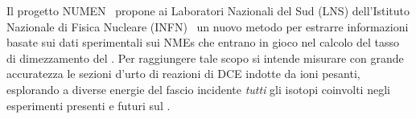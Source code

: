 Il progetto NUMEN~\cite{cappuzzello:epja18} propone ai Laboratori Nazionali del Sud (LNS) dell'Istituto Nazionale di Fisica Nucleare (INFN)~\cite{lns} un nuovo metodo per estrarre informazioni basate sui dati sperimentali sui NMEs che entrano in gioco nel calcolo del tasso di dimezzamento del \doppiobeta{}. 
Per raggiungere tale scopo si intende misurare con grande accuratezza le sezioni d'urto di reazioni di DCE indotte da ioni pesanti, esplorando a diverse energie del fascio incidente \emph{tutti} gli isotopi coinvolti negli esperimenti presenti e futuri sul \doppiobeta{}.

